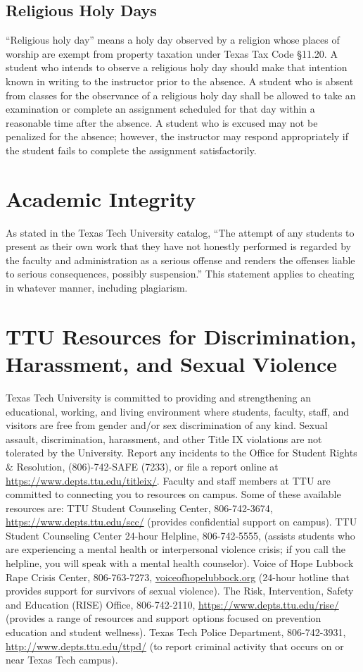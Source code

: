 \documentclass[12pt, notitlepage]{article}   	%
\begin{document}
{\subsection{Religious Holy Days}
“Religious holy day” means a holy day observed by a religion whose places of worship 
are exempt from property taxation under Texas Tax Code §11.20. 
A student who intends to observe a religious holy day should make that intention known 
in writing to the instructor prior to the absence. 
A student who is absent from classes for the observance of a religious holy day shall be 
allowed to take an examination or complete an assignment scheduled for that day within a 
reasonable time after the absence. 
A student who is excused may not be penalized for the absence; however, the instructor 
may respond appropriately if the student fails to complete the assignment satisfactorily.

\section{Academic Integrity}
As stated in the Texas Tech University catalog, “The attempt of any students to present 
as their own work that they have not honestly performed is regarded by the faculty and 
administration as a serious offense and renders the offenses liable to serious 
consequences, possibly suspension.” This statement applies to cheating in whatever 
manner, including plagiarism.

\section{TTU Resources for Discrimination, Harassment, and Sexual Violence}
Texas Tech University is committed to providing and strengthening an educational, 
working, and living environment where students, faculty, staff, and visitors are 
free from gender and/or sex discrimination of any kind. 
Sexual assault, discrimination, harassment, and other Title IX violations are 
not tolerated by the University. 
Report any incidents to the Office for Student Rights & Resolution, 
(806)-742-SAFE (7233), or file a report online at \url{https://www.depts.ttu.edu/titleix/}. 
Faculty and staff members at TTU are committed to connecting you to resources on campus. 
Some of these available resources are: TTU Student Counseling Center, 806-742-3674, 
\url{https://www.depts.ttu.edu/scc/} (provides confidential support on campus). 
TTU Student Counseling Center 24-hour Helpline, 806-742-5555, 
(assists students who are experiencing a mental health or interpersonal violence crisis; 
if you call the helpline, you will speak with a mental health counselor). 
Voice of Hope Lubbock Rape Crisis Center, 806-763-7273, \url{voiceofhopelubbock.org} 
(24-hour hotline that provides support for survivors of sexual violence). 
The Risk, Intervention, Safety and Education (RISE) Office, 806-742-2110, 
\url{https://www.depts.ttu.edu/rise/} (provides a range of resources and 
support options focused on prevention education and student wellness). 
Texas Tech Police Department, 806-742-3931, \url{http://www.depts.ttu.edu/ttpd/} 
(to report criminal activity that occurs on or near Texas Tech campus). 

}
\end{document}
